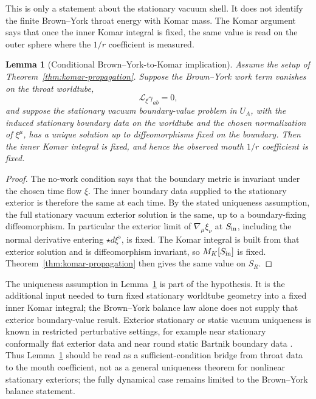 \documentclass[aps,prd,10pt,onecolumn,nofootinbib,superscriptaddress,floatfix]{revtex4-2}
\newtheorem{lemma}{Lemma}
\begin{document}
This is only a statement about the stationary vacuum shell.  It does not
identify the finite Brown--York throat energy with Komar mass.  The Komar
argument says that once the inner Komar integral is fixed, the same value is
read on the outer sphere where the $1/r$ coefficient is measured.

\begin{lemma}[Conditional Brown--York-to-Komar implication]
\label{lem:BY-komar}
Assume the setup of Theorem~\ref{thm:komar-propagation}.  Suppose the
Brown--York work term vanishes on the throat worldtube,
\begin{equation}
  \mathcal L_\xi\gamma_{ab}=0,
\end{equation}
and suppose the stationary vacuum boundary-value problem in $U_A$, with the
induced stationary boundary data on the worldtube and the chosen normalization
of $\xi^\mu$, has a unique solution up to diffeomorphisms fixed on the
boundary.  Then the inner Komar integral is fixed, and hence the observed mouth
$1/r$ coefficient is fixed.
\end{lemma}

\begin{proof}
The no-work condition says that the boundary metric is invariant under the
chosen time flow $\xi$.  The inner boundary data supplied to the stationary
exterior is therefore the same at each time.  By the stated uniqueness
assumption, the full stationary vacuum exterior solution is the same, up to a
boundary-fixing diffeomorphism.  In particular the
exterior limit of $\nabla_\mu\xi_\nu$ at $S_{\rm in}$, including the normal
derivative entering $\star d\xi^\flat$, is fixed.  The Komar integral is built
from that exterior solution and is diffeomorphism invariant, so
$M_K[S_{\rm in}]$ is fixed.  Theorem~\ref{thm:komar-propagation} then gives the
same value on $S_R$.
\end{proof}

The uniqueness assumption in Lemma~\ref{lem:BY-komar} is part of the hypothesis.
It is the additional input needed to turn fixed stationary worldtube geometry
into a fixed inner Komar integral; the Brown--York balance law alone does not
supply that exterior boundary-value result.  Exterior stationary or static
vacuum uniqueness is known in restricted perturbative settings, for example
near stationary conformally flat exterior data and near round static Bartnik
boundary data
\cite{Klenk1999StationaryVacuumExterior,Anderson2015ExteriorStaticVacuum}.
Thus Lemma~\ref{lem:BY-komar} should be read as a sufficient-condition bridge
from throat data to the mouth coefficient, not as a general uniqueness theorem
for nonlinear stationary exteriors; the fully dynamical case remains limited
to the Brown--York balance statement.
\end{document}

